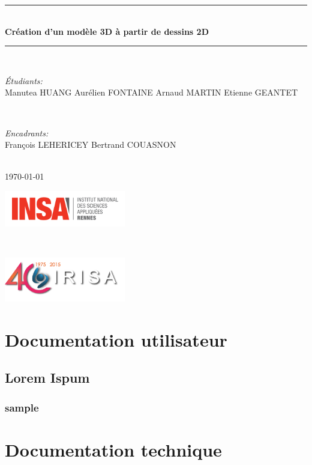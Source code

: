 \documentclass[a4paper,12pt]{report}
\begin{document}
	
	\begin{titlepage}
		
		\newcommand{\HRule}{\rule{\linewidth}{0.5mm}} 
		
		\center 
		
		\HRule \\[0.4cm]
		{ \huge \bfseries Création d'un modèle 3D à partir de dessins 2D}\\[0.4cm]
		\HRule \\[1.5cm]
		
		\begin{minipage}{0.4\textwidth}
			\begin{flushleft} \large
				\emph{Étudiants:} \\
				Manutea \textsc{HUANG}
				Aurélien \textsc{FONTAINE}
				Arnaud \textsc{MARTIN}
				Etienne \textsc{GEANTET}
			\end{flushleft}
		\end{minipage}
		~
		\begin{minipage}{0.4\textwidth}
			\begin{flushright} \large
				\emph{Encadrants:} \\
				François \textsc{LEHERICEY} 
				Bertrand \textsc{COUASNON}
			\end{flushright}
		\end{minipage}\\[3cm]
		
		
		{\large \today}\\[4cm]
		\begin{minipage}{150pt}
		\begin{flushleft}
			\includegraphics[width=150pt]{images/logoInsa.png}
		\end{flushleft}
		\end{minipage}
		~
		\begin{minipage}{150pt}
			\begin{flushright}
				\includegraphics[width=150pt]{images/logoIRISA.png}
			\end{flushright}
		\end{minipage}
		
		
		
		\vfill %
		
	\end{titlepage}
	
	\tableofcontents
	
	\part{Documentation utilisateur}
		\chapter{Lorem Ispum}
			\section{sample}
	\part{Documentation technique}
\end{document}

